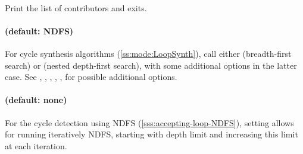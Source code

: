 %


\paragraph{}
Print the list of contributors and exits.



\paragraph{ (default: NDFS)}
For cycle synthesis algorithms (\cref{ss:mode:LoopSynth}), call either  (breadth-first search) or  (nested depth-first search), with some additional options in the latter case.
See
	,
	,
	,
	,
	,
for possible additional options.




\paragraph{ (default: none)}
For the cycle detection using NDFS (\cref{sss:accepting-loop-NDFS}),
setting  allows for running iteratively NDFS,
starting with depth limit  and increasing this limit
at each iteration.

